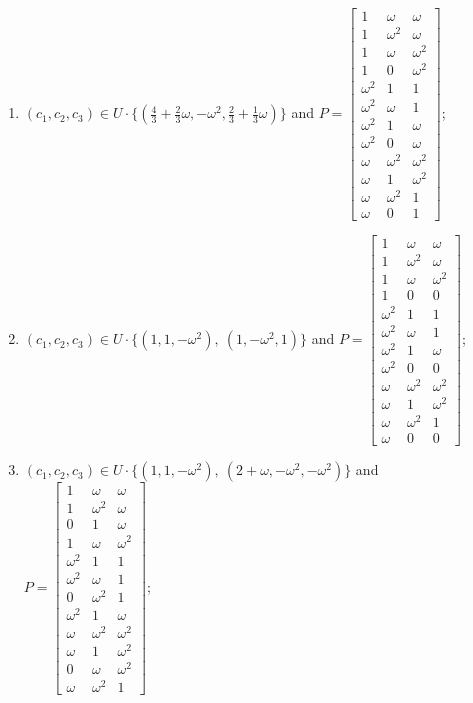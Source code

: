\begin{enumerate}
\item[(f44)\,\newitem] $(c_1,c_2,c_3)\in U\cdot\{(\tfrac{4}{3}+\tfrac{2}{3}\omega,-\omega^2,\tfrac{2}{3}+\tfrac{1}{3}\omega)\}$ and $P=\begin{bmatrix}1&\omega&\omega\\1&\omega^2&\omega\\1&\omega&\omega^2\\1&0&\omega^2\\\omega^2&1&1\\\omega^2&\omega&1\\\omega^2&1&\omega\\\omega^2&0&\omega\\\omega&\omega^2&\omega^2\\\omega&1&\omega^2\\\omega&\omega^2&1\\\omega&0&1\end{bmatrix}$;
\item[(f45)\,\newitem] $(c_1,c_2,c_3)\in U\cdot\{(1,1,-\omega^2),\allowbreak\ (1,-\omega^2,1)\}$ and $P=\begin{bmatrix}1&\omega&\omega\\1&\omega^2&\omega\\1&\omega&\omega^2\\1&0&0\\\omega^2&1&1\\\omega^2&\omega&1\\\omega^2&1&\omega\\\omega^2&0&0\\\omega&\omega^2&\omega^2\\\omega&1&\omega^2\\\omega&\omega^2&1\\\omega&0&0\end{bmatrix}$;
\item[(f46)\,\newitem] $(c_1,c_2,c_3)\in U\cdot\{(1,1,-\omega^2),\allowbreak\ (2+\omega,-\omega^2,-\omega^2)\}$ and $P=\begin{bmatrix}1&\omega&\omega\\1&\omega^2&\omega\\0&1&\omega\\1&\omega&\omega^2\\\omega^2&1&1\\\omega^2&\omega&1\\0&\omega^2&1\\\omega^2&1&\omega\\\omega&\omega^2&\omega^2\\\omega&1&\omega^2\\0&\omega&\omega^2\\\omega&\omega^2&1\end{bmatrix}$;

\end{enumerate}
